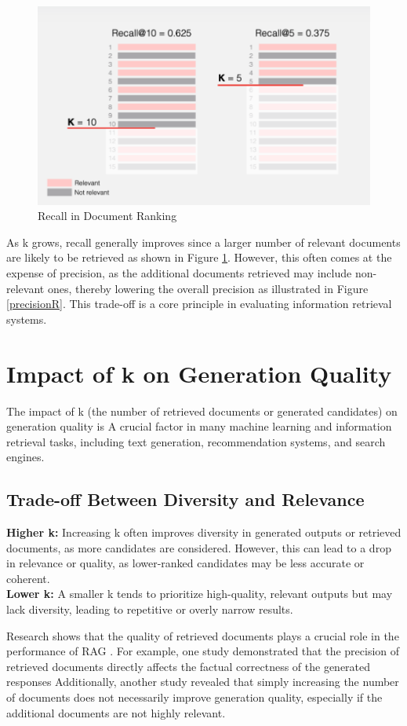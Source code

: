 \begin{figure}[h]
	\centering
	\includegraphics[width=0.7\linewidth]{Figures/recalR.png}
	\caption{Recall in Document Ranking}
	\label{recalR}
	
\end{figure}
As k grows, recall generally improves since a larger number of relevant documents are likely to be retrieved as shown in Figure \ref{recalR}. However, this often comes at the expense of precision, as the additional documents retrieved may include non-relevant ones, thereby lowering the overall precision as illustrated in Figure \ref{precisionR}. This trade-off is a core principle in evaluating information retrieval systems.

\section{Impact of k on Generation Quality}
The impact of k (the number of retrieved documents or generated candidates) on generation quality is A crucial factor in many machine learning and information retrieval tasks, including text generation, recommendation systems, and search engines. 

\subsection{Trade-off Between Diversity and Relevance} 
\textbf{Higher k:} Increasing k often improves diversity in generated outputs or retrieved documents, as more candidates are considered. However, this can lead to a drop in relevance or quality, as lower-ranked candidates may be less accurate or coherent. \\
\textbf{Lower k:} A smaller k tends to prioritize high-quality, relevant outputs but may lack diversity, leading to repetitive or overly narrow results.

Research shows that the quality of retrieved documents plays a crucial role in the performance of RAG . For example, one study demonstrated that the precision of retrieved documents directly affects the factual correctness of the generated responses \citep{salemi2023evaluating}
Additionally, another study \citep{wan2025cognitivealigneddocumentselectionretrievalaugmented} revealed that simply increasing the number of documents does not necessarily improve generation quality, especially if the additional documents are not highly relevant.
